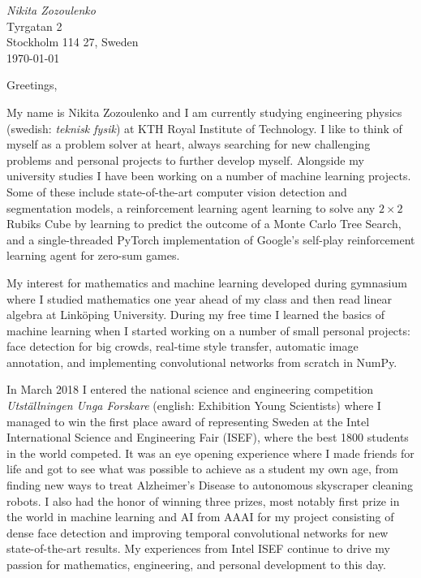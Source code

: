 \documentclass[11pt,a4paper]{article} %
\begin{document}

\begin{flushright}
\textit{Nikita Zozoulenko} \\
Tyrgatan 2\\
Stockholm 114 27, Sweden \\
\today
\end{flushright}
Greetings,

My name is Nikita Zozoulenko and I am currently studying engineering physics (swedish: \textit{teknisk fysik}) at KTH Royal Institute of Technology. I like to think of myself as a problem solver at heart, always searching for new challenging problems and personal projects to further develop myself. Alongside my university studies I have been working on a number of machine learning projects. Some of these include state-of-the-art computer vision detection and segmentation models, a reinforcement learning agent learning to solve any $2 \times 2$ Rubiks Cube by learning to predict the outcome of a Monte Carlo Tree Search, and a single-threaded PyTorch implementation of Google's self-play reinforcement learning agent for zero-sum games.

My interest for mathematics and machine learning developed during gymnasium where I studied mathematics one year ahead of my class and then read linear algebra at Linköping University. During my free time I learned the basics of machine learning when I started working on a number of small personal projects: face detection for big crowds, real-time style transfer, automatic image annotation, and implementing convolutional networks from scratch in NumPy. 

In March 2018 I entered the national science and engineering competition \textit{Utställningen Unga Forskare} (english: Exhibition Young Scientists) where I managed to win the first place award of representing Sweden at the Intel International Science and Engineering Fair (ISEF), where the best 1800 students in the world competed. It was an eye opening experience where I made friends for life and got to see what was possible to achieve as a student my own age, from finding new ways to treat Alzheimer's Disease to autonomous skyscraper cleaning robots. I also had the honor of winning three prizes, most notably first prize in the world in machine learning and AI from AAAI for my project consisting of dense face detection and improving temporal convolutional networks for new state-of-the-art results. My experiences from Intel ISEF continue to drive my passion for mathematics, engineering, and personal development to this day.
\end{document}
